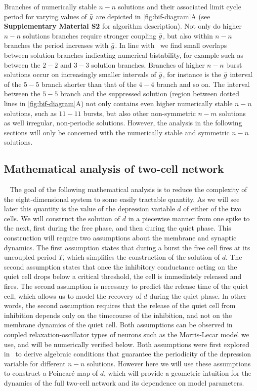 \documentclass[../manuscript.tex]{subfiles}
\begin{document}
Branches of numerically stable $n-n$ solutions and their associated limit cycle period for varying values of $\bar g$ are depicted in \cref{fig:bif-diagram}A (see  \textbf{Supplementary Material S2} for algorithm description).
Not only do higher $n-n$ solutions branches require stronger coupling $\bar g$, but also within $n-n$ branches the period increases with $\bar g$.
In line with~\citet{bose2011} we find small overlaps between solution branches indicating numerical bistability, for example such as between the $2-2$ and $3-3$ solution branches.
Branches of higher $n-n$ burst solutions occur on increasingly smaller intervals of $\bar g$, for instance is the $\bar g$ interval of the $5-5$ branch shorter than that of the $4-4$ branch and so on.
The interval between the $5-5$ branch and the suppressed solution (region between dotted lines in \cref{fig:bif-diagram}A) not only contains even higher numerically stable $n-n$ solutions, such as $11-11$ bursts, but also other non-symmetric $n-m$ solutions as well irregular, non-periodic solutions. However, the analysis in the following sections will only be concerned with the numerically stable and symmetric $n-n$ solutions.

\subsection{Mathematical analysis of two-cell network}
~\label{sec:assumptions}
The goal of the following mathematical analysis is to reduce the complexity of the eight-dimensional system to some easily tractable quantity.
As we will see later this quantity is the value of the depression variable $d$ of either of the two cells.
We will construct the solution of $d$ in a piecewise manner from one spike to the next, first during the free phase, and then during the quiet phase.
This construction will require two assumptions about the membrane and synaptic dynamics.
The first assumption states that during a burst the free cell fires at its uncoupled period $T$, which simplifies the construction of the solution of $d$.
The second assumption states that once the inhibitory conductance acting on the quiet cell drops below a critical threshold, the cell is immediately released and fires.
The second assumption is necessary to predict the release time of the quiet cell, which allows us to model the recovery of $d$ during the quiet phase.
In other words, the second assumption requires that the release of the quiet cell from inhibition depends only on the timecourse of the inhibition, and not on the membrane dynamics of the quiet cell.
Both assumptions can be observed in coupled relaxation-oscillator types of neurons such as the Morris-Lecar model we use, and will be numerically verified below.
Both assumptions were first explored in~\cite{bose2011} to derive algebraic conditions that guarantee the periodicity of the depression variable for different $n-n$ solutions.
However here we will use these assumptions to construct a Poincaré map of $d$, which will provide a geometric intuition for the dynamics of the full two-cell network and its dependence on model parameters.
\end{document}
